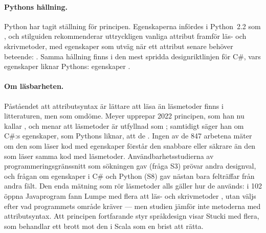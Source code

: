 \paragraph{Pythons hållning.}  Python har tagit ställning för principen.
Egenskaperna infördes i Python~2.2 som
, och stilguiden rekommenderar uttryckligen vanliga
attribut framför läs- och skrivmetoder, med egenskaper som utväg när
ett attribut senare behöver beteende:
.  Samma
hållning finns i den mest spridda designriktlinjen för C\#, vars
egenskaper liknar Pythons: egenskaper .

\paragraph{Om läsbarheten.}  Påståendet att attributsyntax är lättare
att läsa än läsmetoder finns i litteraturen, men som omdöme.  Meyer
upprepar 2022 principen, som han nu kallar , och menar att läsmetoder är utfyllnad som
;
samtidigt säger han om C\#:s egenskaper, som Pythons liknar, att de
.  Ingen av de 847 arbetena mäter om den som läser kod med
egenskaper förstår den snabbare eller säkrare än den som läser samma
kod med läsmetoder.  Användbarhetsstudierna av programmeringsgränssnitt
som sökningen gav (fråga S3) prövar andra designval, och frågan om
egenskaper i C\# och Python (S8) gav nästan bara felträffar från andra
fält.  Den enda mätning som rör läsmetoder alls gäller hur de
används: i 102 öppna Javaprogram fann Lumpe med flera att läs- och
skrivmetoder , utan väljs efter vad programmets
område kräver --- men studien jämför inte metoderna med
attributsyntax.  Att principen fortfarande styr språkdesign visar
Stucki med flera, som behandlar ett brott mot den i Scala som en brist
att rätta\autocite{Stucki2018Truly}.

